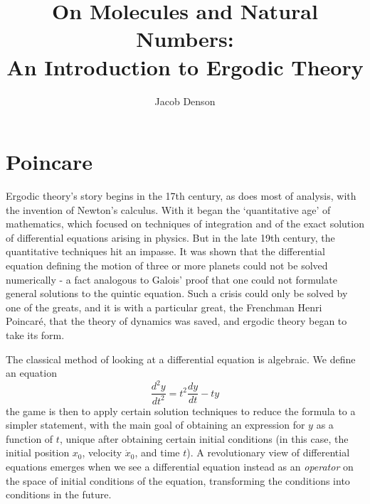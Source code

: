 


\title{On Molecules and Natural Numbers:\\
An Introduction to Ergodic Theory}
\author{Jacob Denson}




\maketitle



\chapter{Poincare}

Ergodic theory's story begins in the 17th century, as does most of analysis, with the invention of Newton's calculus. With it began the `quantitative age' of mathematics, which focused on techniques of integration and of the exact solution of differential equations arising in physics. But in the late 19th century, the quantitative techniques hit an impasse. It was shown that the differential equation defining the motion of three or more planets could not be solved numerically - a fact analogous to Galois' proof that one could not formulate general solutions to the quintic equation. Such a crisis could only be solved by one of the greats, and it is with a particular great, the Frenchman Henri Poincar\'{e}, that the theory of dynamics was saved, and ergodic theory began to take its form.

The classical method of looking at a differential equation is algebraic. We define an equation
%
\[ \frac{d^2 y}{dt^2} = t^2 \frac{dy}{dt} - ty \]
%
the game is then to apply certain solution techniques to reduce the formula to a simpler statement, with the main goal of obtaining an expression for $y$ as a function of $t$, unique after obtaining certain initial conditions (in this case, the initial position $x_0$, velocity $\dot{x}_0$, and time $t$). A revolutionary view of differential equations emerges when we see a differential equation instead as an {\it operator} on the space of initial conditions of the equation, transforming the conditions into conditions in the future.

